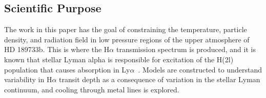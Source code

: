 \documentclass[onecolumn]{aastex63}
\newcommand\lya{Ly$\alpha$\ }
\begin{document}
\subsection{Scientific Purpose}

The work in this paper has the goal of constraining the temperature, particle density, and radiation field in low pressure regions of the upper atmosphere of HD 189733b. This is where the H$\alpha$ transmission spectrum is produced, and it is known that stellar Lyman alpha is responsible for excitation of the H(2l) population that causes absorption in \lya. Models are constructed to understand variability in H$\alpha$ transit depth as a consequence of variation in the stellar Lyman continuum, and cooling through metal lines is explored. 





\end{document}
